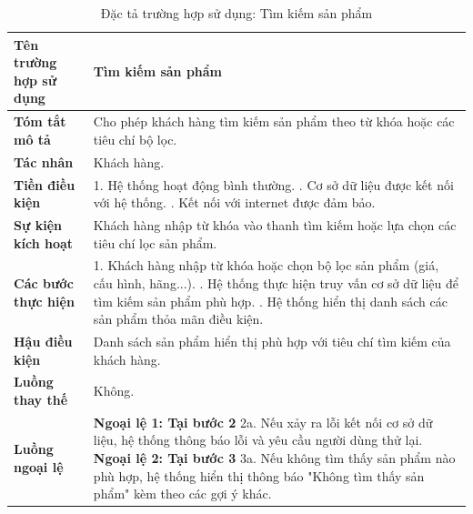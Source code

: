 \begin{longtable}{|>{\bfseries}p{4cm}|p{11.5cm}|}
\caption{Đặc tả trường hợp sử dụng: Tìm kiếm sản phẩm}
\label{tab:uc-search-product} \\
\hline
\textbf{Tên trường hợp sử dụng} & Tìm kiếm sản phẩm \\
\hline
\textbf{Tóm tắt mô tả} & Cho phép khách hàng tìm kiếm sản phẩm theo từ khóa hoặc các tiêu chí bộ lọc. \\
\hline
\textbf{Tác nhân} & Khách hàng. \\
\hline
\textbf{Tiền điều kiện} & 1. Hệ thống hoạt động bình thường. \newline
2. Cơ sở dữ liệu được kết nối với hệ thống. \newline
3. Kết nối với internet được đảm bảo. \\
\hline
\textbf{Sự kiện kích hoạt} & Khách hàng nhập từ khóa vào thanh tìm kiếm hoặc lựa chọn các tiêu chí lọc sản phẩm. \\
\hline
\textbf{Các bước thực hiện} & 1. Khách hàng nhập từ khóa hoặc chọn bộ lọc sản phẩm (giá, cấu hình, hãng...). \newline
2. Hệ thống thực hiện truy vấn cơ sở dữ liệu để tìm kiếm sản phẩm phù hợp. \newline
3. Hệ thống hiển thị danh sách các sản phẩm thỏa mãn điều kiện. \\
\hline
\textbf{Hậu điều kiện} & Danh sách sản phẩm hiển thị phù hợp với tiêu chí tìm kiếm của khách hàng. \\
\hline
\textbf{Luồng thay thế} & Không. \\
\hline
\textbf{Luồng ngoại lệ} & \textbf{Ngoại lệ 1: Tại bước 2} \newline
2a. Nếu xảy ra lỗi kết nối cơ sở dữ liệu, hệ thống thông báo lỗi và yêu cầu người dùng thử lại. \newline
\textbf{Ngoại lệ 2: Tại bước 3} \newline
3a. Nếu không tìm thấy sản phẩm nào phù hợp, hệ thống hiển thị thông báo "Không tìm thấy sản phẩm" kèm theo các gợi ý khác. \\
\hline
\end{longtable}

